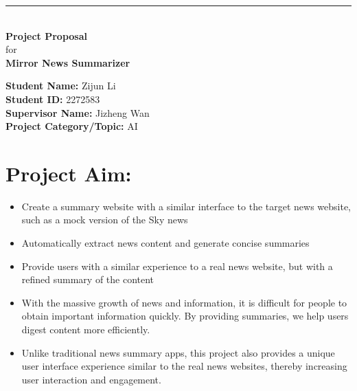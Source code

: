 \documentclass[a4paper]{article}
\begin{document}

\begin{titlepage}
	
	\rule{\linewidth}{5pt}
	\raggedleft
	\fontsize{38pt}{50pt}\selectfont
    \textbf{\\Project Proposal\\}
    \fontsize{28pt}{60pt}\selectfont 
    for\\
    \fontsize{38pt}{60pt}\selectfont 
    \textbf{Mirror News Summarizer\\}
	
	\vfill %
	
	
	\parbox[t]{0.93\textwidth}{ %
		\raggedleft %
		\large %
		{\bf Student Name:} Zijun Li\\
        {\bf Student ID:} 2272583\\
        {\bf Supervisor Name:} Jizheng Wan\\
        {\bf Project Category/Topic:} AI\\
	}
	
\end{titlepage}

\section{Project Aim:}

\begin{itemize}
    \item Create a summary website with a similar interface to the target news website, such as a mock version of the Sky news
    \item Automatically extract news content and generate concise summaries
    \item Provide users with a similar experience to a real news website, but with a refined summary of the content
    \item With the massive growth of news and information, it is difficult for people to obtain important information quickly. By providing summaries, we help users digest content more efficiently.
    \item Unlike traditional news summary apps, this project also provides a unique user interface experience similar to the real news websites, thereby increasing user interaction and engagement.
\end{itemize}
\end{document}
